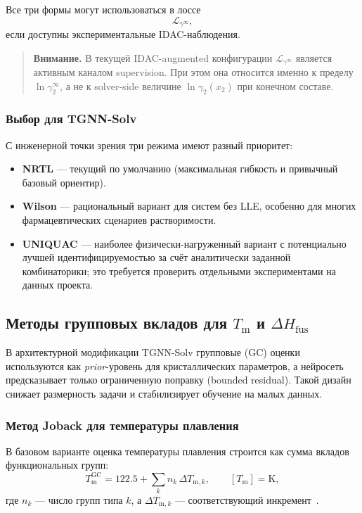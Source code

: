 \documentclass[11pt]{article}
\newcommand{\warnnote}[1]{\begin{quote}\textbf{Внимание.} #1\end{quote}}
\begin{document}
Все три формы могут использоваться в лоссе
\begin{equation*}
\mathcal{L}_{\gamma^{\infty}},
\end{equation*}
если доступны экспериментальные IDAC-наблюдения.

\warnnote{В текущей IDAC-augmented конфигурации $\mathcal{L}_{\gamma^\infty}$ является активным каналом supervision. При этом она относится именно к пределу $\ln\gamma_2^{\infty}$, а не к solver-side величине $\ln\gamma_2(x_2)$ при конечном составе.}

\subsubsection{Выбор для TGNN-Solv}

С инженерной точки зрения три режима имеют разный приоритет:
\begin{itemize}
  \item \textbf{NRTL} --- текущий по умолчанию (максимальная гибкость и привычный базовый ориентир).
  \item \textbf{Wilson} --- рациональный вариант для систем без LLE, особенно для многих фармацевтических сценариев растворимости.
  \item \textbf{UNIQUAC} --- наиболее физически-нагруженный вариант с потенциально лучшей идентифицируемостью за счёт аналитически заданной комбинаторики; это требуется проверить отдельными экспериментами на данных проекта.
\end{itemize}


\subsection{Методы групповых вкладов для $T_{\mathrm{m}}$ и $\Delta H_{\mathrm{fus}}$}
\label{subsec:gc-methods}

В архитектурной модификации TGNN-Solv групповые (GC) оценки используются как \textit{prior}-уровень для кристаллических параметров, а нейросеть предсказывает только ограниченную поправку (bounded residual). Такой дизайн снижает размерность задачи и стабилизирует обучение на малых данных.

\subsubsection{Метод Joback для температуры плавления}

В базовом варианте оценка температуры плавления строится как сумма вкладов функциональных групп:
\begin{equation*}
T_{\mathrm{m}}^{\mathrm{GC}} = 122.5 + \sum_k n_k\,\Delta T_{\mathrm{m},k}, \qquad [T_{\mathrm{m}}]=\mathrm{K},
\end{equation*}
где $n_k$ --- число групп типа $k$, а $\Delta T_{\mathrm{m},k}$ --- соответствующий инкремент~\cite{joback1987,marrero2001}.
\end{document}
